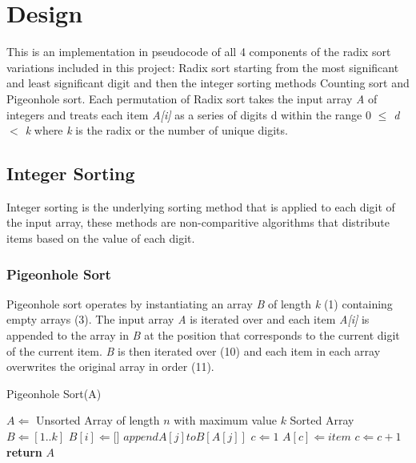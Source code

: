 \documentclass[12pt]{article}
\begin{document}
\section{Design}
\label{sec:design}

	This is an implementation in pseudocode of all 4 components of the radix sort variations included in this project: Radix sort starting from the most significant and least significant digit and then the integer sorting methods Counting sort and Pigeonhole sort. Each permutation of Radix sort takes the input array \textit{A} of integers and treats each item \textit{A[i]} as a series of digits d within the range 0 \textit{$\leq$ d $<$ k} where \textit{k} is the radix or the number of unique digits. 
	\subsection{Integer Sorting}
	Integer sorting is the underlying sorting method that is applied to each digit of the input array, these methods are non-comparitive algorithms that distribute items based on the value of each digit. 
	\subsubsection{Pigeonhole Sort}
	Pigeonhole sort operates by instantiating an array \textit{B} of length \textit{k} (1) containing empty arrays (3). The input array \textit{A} is iterated over and each item \textit{A[i]} is appended to the array in \textit{B} at the position that corresponds to the current digit of the current item. \textit{B} is then iterated over (10) and each item in each array overwrites the original array in order (11). 
	\begin{algorithm}[H] %
		\caption{Pigeonhole Sort({A})} %
		\label{alg1} %
		\begin{algorithmic}[1] %
			\REQUIRE $A \Leftarrow$ Unsorted Array of length $n$ with maximum value $k$
			\ENSURE Sorted Array
			\STATE $B \Leftarrow [1..k]$ 
			\STATE $B[i] \Leftarrow [$\space$]$ 
			\ENDFOR
			\STATE $append$\space$ A[j]$\space$ to$\space$ B[A[j]]$ 
			\ENDFOR
			\STATE $c \Leftarrow 1$ 
			\STATE $A[c] \Leftarrow item$ 
			\STATE $c \Leftarrow c + 1$
			\ENDFOR
			\ENDFOR
			\STATE \textbf{return} $A$
		\end{algorithmic}
	\end{algorithm}
\end{document}
